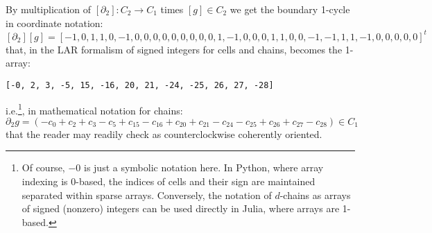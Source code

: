 \begin{example}
By multiplication of $[\partial_2]: C_2\to C_1$ times $[g]\in C_2$ we get the boundary 1-cycle in coordinate notation:
\[
[\partial_2][g] = 
[-1,0,1,1,0,-1,0,0,0,0,0,0,0,0,0,1,-1,0,0,0,1,1,0,0,-1,-1,1,1,-1,0,0,0,0,0]^t
\]
that, in the LAR formalism of signed integers for cells and chains, becomes the 1-array:
\begin{verbatim}
[-0, 2, 3, -5, 15, -16, 20, 21, -24, -25, 26, 27, -28]
\end{verbatim}
i.e.\footnote{Of course, $-0$ is just a symbolic notation here. In Python, where array indexing is 0-based, the indices of cells and their sign are maintained separated within sparse arrays. Conversely, the notation of $d$-chains as arrays of signed (nonzero) integers can be used directly  in Julia, where arrays are 1-based. }, in mathematical notation for chains:
\[
\partial_2 g = (-c_0+c_2+c_3-c_5+c_{15}-c_{16}+c_{20}+c_{21}-c_{24}-c_{25}+c_{26}+c_{27}-c_{28})\in C_1
\]
that the reader may readily check as  counterclockwise coherently oriented.
\end{example} %



